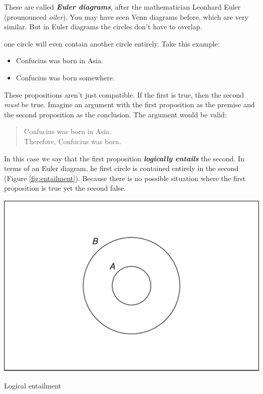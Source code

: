 \documentclass[justified]{tufte-book}
\providecommand{\tightlist}{%
  \setlength{\itemsep}{0pt}\setlength{\parskip}{0pt}}
\newenvironment{argument}{\begin{quote}\normalsize}{\end{quote}}
\theoremstyle{definition}
\theoremstyle{definition}
\theoremstyle{definition}
\theoremstyle{remark}
\begin{document}
These are called \textbf{\emph{Euler diagrams}}, after the mathematician
Leonhard Euler (prounounced \emph{oiler}). You may have seen Venn
diagrams before, which are very similar. But in Euler diagrams the
circles don't have to overlap.

 one circle will even contain another circle
entirely. Take this example:

\begin{itemize}
\tightlist
\item
  Confucius was born in Asia.
\item
  Confucius was born somewhere.
\end{itemize}

These propositions aren't just compatible. If the first is true, then
the second \emph{must} be true. Imagine an argument with the first
proposition as the premise and the second proposition as the conclusion.
The argument would be valid:

\begin{argument}
Confucius was born in Asia.\\
Therefore, Confucius was born.
\end{argument}

In this case we say that the first proposition \textbf{\emph{logically
entails}} the second. In terms of an Euler diagram, he first circle is
contained entirely in the second (Figure \ref{fig:entailment}). Because
there is no possible situation where the first proposition is true yet
the second false.

\begin{marginfigure}
\includegraphics{_main_files/figure-latex/entailment-1} \caption[Logical entailment]{Logical entailment}\label{fig:entailment}
\end{marginfigure}
\end{document}
